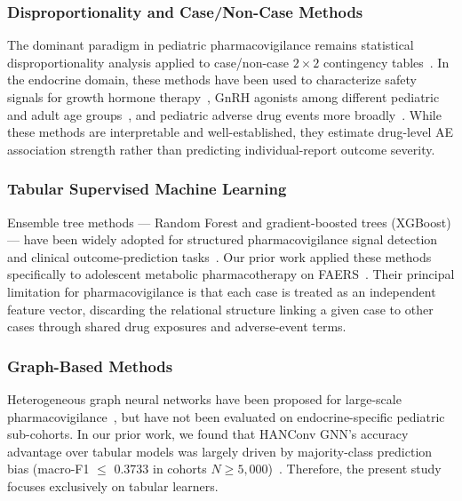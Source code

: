 \documentclass[10pt,twocolumn]{article}
\newcommand{\FAERS}{\textsf{FAERS}\xspace}
\begin{document}
\subsubsection{Disproportionality and Case/Non-Case Methods}
The dominant paradigm in pediatric pharmacovigilance remains statistical disproportionality analysis applied to case/non-case $2\times2$ contingency tables~\cite{vanpuijenbroek2002, rothman2004}. In the endocrine domain, these methods have been used to characterize safety signals for growth hormone therapy~\cite{bell2010}, GnRH agonists among different pediatric and adult age groups~\cite{stochholm2020}, and pediatric adverse drug events more broadly~\cite{chen2020thyroid}. While these methods are interpretable and well-established, they estimate drug-level AE association strength rather than predicting individual-report outcome severity.
 
\subsubsection{Tabular Supervised Machine Learning}
Ensemble tree methods --- Random Forest and gradient-boosted trees (XGBoost) --- have been widely adopted for structured pharmacovigilance signal detection and clinical outcome-prediction tasks~\cite{tian2025, farnoush2024}. Our prior work applied these methods specifically to adolescent metabolic pharmacotherapy on \FAERS~\cite{telkar2026obesity}. Their principal limitation for pharmacovigilance is that each case is treated as an independent feature vector, discarding the relational structure linking a given case to other cases through shared drug exposures and adverse-event terms.
 
\subsubsection{Graph-Based Methods}
Heterogeneous graph neural networks have been proposed for large-scale pharmacovigilance~\cite{gao2025, shi2026}, but have not been evaluated on endocrine-specific pediatric sub-cohorts. In our prior work, we found that HANConv GNN's accuracy advantage over tabular models was largely driven by majority-class prediction bias (macro-F1 $\le$ 0.3733 in cohorts $N \ge 5{,}000$)~\cite{telkar2026obesity}. Therefore, the present study focuses exclusively on tabular learners.
 
\end{document}
